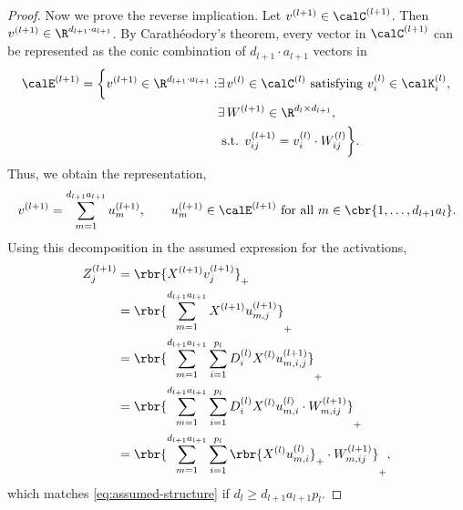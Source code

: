 \documentclass{article}
\newcommand{\calKl}{\calK^{(l)}}
\begin{document}
\begin{proof}
    Now we prove the reverse implication.
    Let \( v^{(l+1)} \in \calC^{(l+1)} \).
    Then \( v^{(l+1)} \in \R^{d_{l+1} \cdot a_{l+1}} \).
    By Carathéodory's theorem, every vector in \( \calC^{(l+1)} \) can be
    represented as the conic combination of \( d_{l+1} \cdot a_{l+1} \) vectors
    in
    \[
        \begin{aligned}
            \calE^{(l+1)}
            =
            \bigg\{
            v^{(l+1)} \in \R^{d_{l+1} \cdot a_{l+1}} :
             & \exists \, v^{(l)} \in \calC^{(l)}
            \text{ satisfying } v_{i}^{(l)} \in \calKl_i, \,                 \\
             & \exists \, W^{(l+1)} \in \R^{d_l \times d_{l+1}},             \\
             & \text{ s.t. } v^{(l+1)}_{ij} = v^{(l)}_{i} \cdot W_{ij}^{(l)}
            \bigg\}.
        \end{aligned}
    \]
    Thus, we obtain the representation,
    \begin{equation}
        v^{(l+1)}
        = \sum_{m=1}^{d_{l+1} a_{l+1}} u_m^{(l+1)},
        \quad \quad u_m^{(l+1)} \in \calE^{(l+1)}
        \text{ for all } m \in \cbr{1, \ldots, d_{l+1} a_l}.
    \end{equation}
    Using this decomposition in the assumed expression for the activations,
    \begin{align*}
        Z_{j}^{(l+1)}
         & = \rbr{X^{(l+1)} v^{(l+1)}_{j}}_+                                 \\
         & = \rbr{\sum_{m=1}^{d_{l+1} a_{l+1}} X^{(l+1)} u^{(l+1)}_{m, j}}_+ \\
         & = \rbr{\sum_{m=1}^{d_{l+1} a_{l+1}} \sum_{i=1}^{p_{l}}
        D_{i}^{(l)} X^{(l)} u^{(l+1)}_{m, i, j}}_+                           \\
         & = \rbr{\sum_{m=1}^{d_{l+1} a_{l+1}} \sum_{i=1}^{p_{l}}
        D_{i}^{(l)} X^{(l)} u^{(l)}_{m, i} \cdot W_{m, ij}^{(l+1)}}_+        \\
         & = \rbr{\sum_{m=1}^{d_{l+1} a_{l+1}} \sum_{i=1}^{p_{l}}
        \rbr{X^{(l)} u^{(l)}_{m, i}}_+ \cdot W_{m, ij}^{(l+1)}}_+,
    \end{align*}
    which matches \cref{eq:assumed-structure} if \( d_l \geq d_{l+1} a_{l+1} p_{l} \).


\end{proof}
\end{document}
